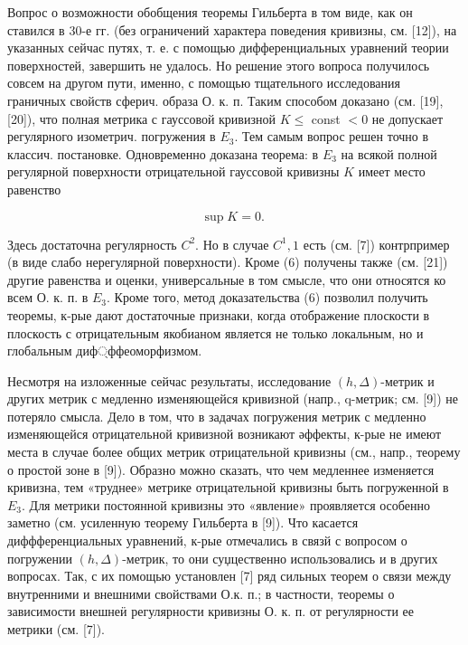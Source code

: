 \documentclass[10pt]{article}
\begin{document}
Вопрос о возможности обобщения теоремы Гильберта в том виде, как он ставился в 30-е гг. (без ограничений характера поведения кривизны, см. [12]), на указанных сейчас путях, т. е. с помощью дифференциальных уравнений теории поверхностей, завершить не удалось. Но решение этого вопроса получилось совсем на другом пути, именно, с помощью тщательного исследования граничных свойств сферич. образа О. к. п. Таким способом доказано (см. [19], [20]), что полная метрика с гауссовой кривизной $K \leqslant$ const $<0$ не допускает регулярного изометрич. погружения в $E_{3}$. Тем самым вопрос решен точно в классич. постановке. Одновременно доказана теорема: в $E_{3}$ на всякой полной регулярной поверхности отрицательной гауссовой кривизны $K$ имеет место равенство



\[

\sup K=0 \text {. }

\]



Здесь достаточна регулярность $C^{2}$. Но в случае $C^{1}, 1$ есть (см. [7]) контрпример (в виде слабо нерегулярной поверхности). Кроме (6) получены также (см. [21]) другие равенства и оценки, универсальные в том смысле, что они относятся ко всем О. к. п. в $E_{3}$. Кроме того, метод доказательства (6) позволил получить теоремы, к-рые дают достаточные признаки, когда отображение плоскости в плоскость с отрицательным якобианом является не только локальным, но и глобальным диф্ффеоморфизмом.



Несмотря на изложенные сейчас результаты, исследование $(h, \Delta)$-метрик и других метрик с медленно изменяющейся кривизной (напр., q-метрик; см. [9]) не потеряло смысла. Дело в том, что в задачах погружения метрик с медленно изменяющейся отрицательной кривизной возникают әффекты, к-рые не имеют места в случае более общих метрик отрицательной кривизны (см., напр., теорему о простой зоне в [9]). Образно можно сказать, что чем медленнее изменяется кривизна, тем «труднее» метрике отрицательной кривизны быть погруженной в $E_{3}$. Для метрики постоянной кривизны это «явление» проявляется особенно заметно (см. усиленную теорему Гильберта в [9]). Что касается диффференциальных уравнений, к-рые отмечались в связй с вопросом о погружении $(h, \Delta)$-метрик, то они суџцественно использовались и в других вопросах. Так, с их помощью установлен [7] ряд сильных теорем о связи между внутренними и внешними свойствами О.к. п.; в частности, теоремы о зависимости внешнеӥ регулярности кривизны О. к. п. от регулярности ее метрики (см. [7]).
\end{document}
